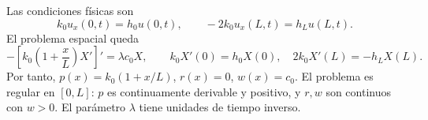 Las condiciones físicas son
\[
k_0u_x(0,t)=h_0u(0,t),\qquad
-2k_0u_x(L,t)=h_Lu(L,t).
\]
El problema espacial queda
\[
-\left[k_0\left(1+\frac{x}{L}\right)X'\right]'=\lambda c_0X,
\qquad k_0X'(0)=h_0X(0),\quad
2k_0X'(L)=-h_LX(L).
\]
Por tanto, \(p(x)=k_0(1+x/L)\), \(r(x)=0\), \(w(x)=c_0\). El problema es regular en \([0,L]\): \(p\) es continuamente derivable y positivo, y \(r,w\) son continuos con \(w>0\). El parámetro \(\lambda\) tiene unidades de tiempo inverso.
